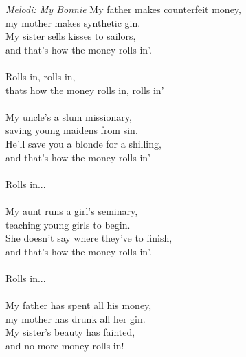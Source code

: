 {\footnotesize\textit{Melodi: My Bonnie}}
My father makes counterfeit money,\\
my mother makes synthetic gin.\\
My sister sells kisses to sailors,\\
and that's how the money rolls in'.\\
\\
\revrpt Rolls in, rolls in,\\
thats how the money rolls in, rolls in' \rpt\\
\\
My uncle's a slum missionary,\\
saving young maidens from sin.\\
He'll save you a blonde for a shilling,\\
and that's how the money rolls in'\\
\\
Rolls in...\\
\\
My aunt runs a girl's seminary,\\
teaching young girls to begin.\\
She doesn't say where they've to finish,\\
and that's how the money rolls in'.\\
\\
Rolls in...\\
\\
My father has spent all his money,\\
my mother has drunk all her gin.\\
My sister’s beauty has fainted,\\
and no more money rolls in!
\par
\vspace{10pt}
